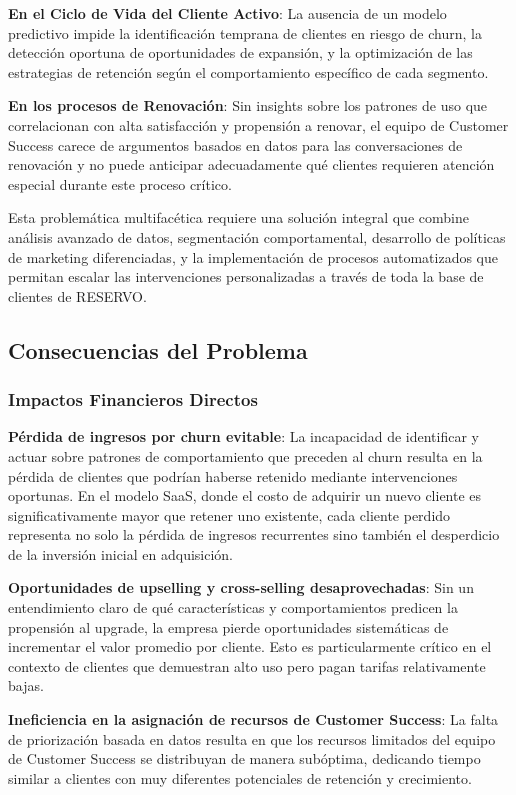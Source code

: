 \textbf{En el Ciclo de Vida del Cliente Activo}: La ausencia de un modelo predictivo impide la identificación temprana de clientes en riesgo de churn, la detección oportuna de oportunidades de expansión, y la optimización de las estrategias de retención según el comportamiento específico de cada segmento.

\textbf{En los procesos de Renovación}: Sin insights sobre los patrones de uso que correlacionan con alta satisfacción y propensión a renovar, el equipo de Customer Success carece de argumentos basados en datos para las conversaciones de renovación y no puede anticipar adecuadamente qué clientes requieren atención especial durante este proceso crítico.

Esta problemática multifacética requiere una solución integral que combine análisis avanzado de datos, segmentación comportamental, desarrollo de políticas de marketing diferenciadas, y la implementación de procesos automatizados que permitan escalar las intervenciones personalizadas a través de toda la base de clientes de RESERVO.

\subsection{Consecuencias del Problema}

\subsubsection{Impactos Financieros Directos}

\textbf{Pérdida de ingresos por churn evitable}: La incapacidad de identificar y actuar sobre patrones de comportamiento que preceden al churn resulta en la pérdida de clientes que podrían haberse retenido mediante intervenciones oportunas. En el modelo SaaS, donde el costo de adquirir un nuevo cliente es significativamente mayor que retener uno existente, cada cliente perdido representa no solo la pérdida de ingresos recurrentes sino también el desperdicio de la inversión inicial en adquisición.

\textbf{Oportunidades de upselling y cross-selling desaprovechadas}: Sin un entendimiento claro de qué características y comportamientos predicen la propensión al upgrade, la empresa pierde oportunidades sistemáticas de incrementar el valor promedio por cliente. Esto es particularmente crítico en el contexto de clientes que demuestran alto uso pero pagan tarifas relativamente bajas.

\textbf{Ineficiencia en la asignación de recursos de Customer Success}: La falta de priorización basada en datos resulta en que los recursos limitados del equipo de Customer Success se distribuyan de manera subóptima, dedicando tiempo similar a clientes con muy diferentes potenciales de retención y crecimiento.

